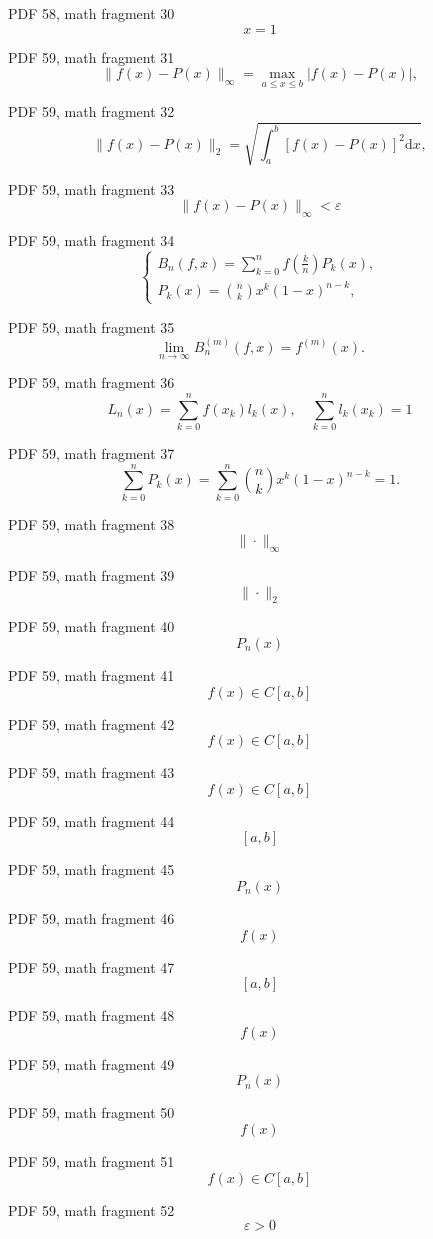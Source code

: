 \documentclass[UTF8,fontset=fandol]{ctexart}
\begin{document}
PDF 58, math fragment 30
\[x=1\]
\par
PDF 59, math fragment 31
\[
\| f(x) - P(x) \|_{\infty} = \max_{a \leqslant x \leqslant b} |f(x) - P(x)|, \tag{3.1.2}
\]
\par
PDF 59, math fragment 32
\[
\| f(x) - P(x) \|_{2} = \sqrt{\int_{a}^{b} [f(x) - P(x)]^{2} \mathrm{d}x}, \tag{3.1.3}
\]
\par
PDF 59, math fragment 33
\[
\| f(x) - P(x) \|_{\infty} < \varepsilon
\]
\par
PDF 59, math fragment 34
\[
\begin{cases} B_{n}(f,x) = \sum_{k=0}^{n} f\left(\frac{k}{n}\right) P_{k}(x), \\ P_{k}(x) = \binom{n}{k} x^{k}(1-x)^{n-k}, \end{cases} \tag{3.1.4}
\]
\par
PDF 59, math fragment 35
\[
\lim_{n \to \infty} B_{n}^{(m)}(f,x) = f^{(m)}(x).
\]
\par
PDF 59, math fragment 36
\[
L_{n}(x) = \sum_{k=0}^{n} f\left(x_{k}\right) l_{k}(x), \quad \sum_{k=0}^{n} l_{k}(x_{k}) = 1
\]
\par
PDF 59, math fragment 37
\[
\sum_{k=0}^{n} P_{k}(x) = \sum_{k=0}^{n} \binom{n}{k} x^{k}(1-x)^{n-k} = 1. \tag{3.1.5}
\]
\par
PDF 59, math fragment 38
\[\| \cdot \|_{\infty}\]
\par
PDF 59, math fragment 39
\[\| \cdot \|_{2}\]
\par
PDF 59, math fragment 40
\[P_{n}(x)\]
\par
PDF 59, math fragment 41
\[f(x) \in C[a,b]\]
\par
PDF 59, math fragment 42
\[f(x) \in C[a,b]\]
\par
PDF 59, math fragment 43
\[f(x) \in C[a,b]\]
\par
PDF 59, math fragment 44
\[[a,b]\]
\par
PDF 59, math fragment 45
\[P_{n}(x)\]
\par
PDF 59, math fragment 46
\[f(x)\]
\par
PDF 59, math fragment 47
\[[a,b]\]
\par
PDF 59, math fragment 48
\[f(x)\]
\par
PDF 59, math fragment 49
\[P_{n}(x)\]
\par
PDF 59, math fragment 50
\[f(x)\]
\par
PDF 59, math fragment 51
\[f(x) \in C[a,b]\]
\par
PDF 59, math fragment 52
\[\varepsilon > 0\]
\par
\end{document}
